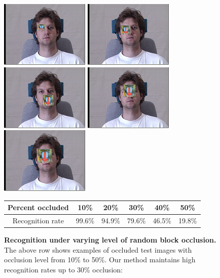 \documentclass[10pt,journal,letterpaper,compsoc]{IEEEtran} %
\begin{document}
\begin{figure}[t]
\centering
\includegraphics[scale=0.75,clip=true]{figures_pami/multipie_occ/occ10.png}
\includegraphics[scale=0.75,clip=true]{figures_pami/multipie_occ/occ20.png}
\includegraphics[scale=0.75,clip=true]{figures_pami/multipie_occ/occ30.png}
\includegraphics[scale=0.75,clip=true]{figures_pami/multipie_occ/occ40.png}
\includegraphics[scale=0.75,clip=true]{figures_pami/multipie_occ/occ50.png}
\vspace{0mm}
\caption{{\bf Recognition under varying level of
random block occlusion.} The above row shows examples of occluded test images with occlusion level from 10\% to 50\%. Our method maintains high recognition rates up to 30\% occlusion:}
\vspace{3mm}
{\small
\begin{tabular}{|c|c|c|c|c|c| }
\hline
Percent occluded & 10\% & 20\% & 30\% & 40\% & 50\%  \\
\hline
\hline
Recognition rate & 99.6\% & 94.9\% & 79.6\% & 46.5\% & 19.8\% \\
\hline
\end{tabular}
}
\label{fig:multipie-occ-rec}
\vspace{0mm}
\end{figure}
\end{document}
